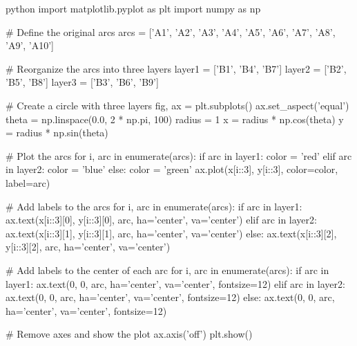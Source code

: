 python
import matplotlib.pyplot as plt
import numpy as np

# Define the original arcs
arcs = ['A1', 'A2', 'A3', 'A4', 'A5', 'A6', 'A7', 'A8', 'A9', 'A10']

# Reorganize the arcs into three layers
layer1 = ['B1', 'B4', 'B7']
layer2 = ['B2', 'B5', 'B8']
layer3 = ['B3', 'B6', 'B9']

# Create a circle with three layers
fig, ax = plt.subplots()
ax.set_aspect('equal')
theta = np.linspace(0.0, 2 * np.pi, 100)
radius = 1
x = radius * np.cos(theta)
y = radius * np.sin(theta)

# Plot the arcs
for i, arc in enumerate(arcs):
    if arc in layer1:
        color = 'red'
    elif arc in layer2:
        color = 'blue'
    else:
        color = 'green'
    ax.plot(x[i::3], y[i::3], color=color, label=arc)

# Add labels to the arcs
for i, arc in enumerate(arcs):
    if arc in layer1:
        ax.text(x[i::3][0], y[i::3][0], arc, ha='center', va='center')
    elif arc in layer2:
        ax.text(x[i::3][1], y[i::3][1], arc, ha='center', va='center')
    else:
        ax.text(x[i::3][2], y[i::3][2], arc, ha='center', va='center')

# Add labels to the center of each arc
for i, arc in enumerate(arcs):
    if arc in layer1:
        ax.text(0, 0, arc, ha='center', va='center', fontsize=12)
    elif arc in layer2:
        ax.text(0, 0, arc, ha='center', va='center', fontsize=12)
    else:
        ax.text(0, 0, arc, ha='center', va='center', fontsize=12)

# Remove axes and show the plot
ax.axis('off')
plt.show()